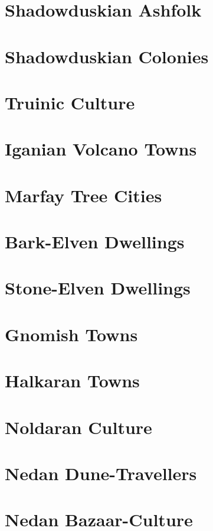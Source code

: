\section{Shadowduskian Ashfolk}

\section{Shadowduskian Colonies}

\section{Truinic Culture} %

\section{Iganian Volcano Towns}

\section{Marfay Tree Cities}

\section{Bark-Elven Dwellings}

\section{Stone-Elven Dwellings}

\section{Gnomish Towns}

\section{Halkaran Towns}

\section{Noldaran Culture}

\section{Nedan Dune-Travellers}

\section{Nedan Bazaar-Culture}

